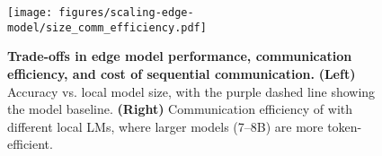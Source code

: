 \begin{figure}[t]
    \centering
    \texttt{[image: figures/scaling-edge-model/size\_comm\_efficiency.pdf]}
    \vspace{-1em}
    \caption{\textbf{Trade-offs in edge model performance, communication efficiency, and cost of sequential communication.} \textbf{(Left)} Accuracy vs. local model size, with the purple dashed line showing the \gpt model baseline. \textbf{(Right)} Communication efficiency of \system with different local LMs, where larger models (7–8B) are more token-efficient.}
    \label{fig:scaling-edge-model}
  \end{figure}


